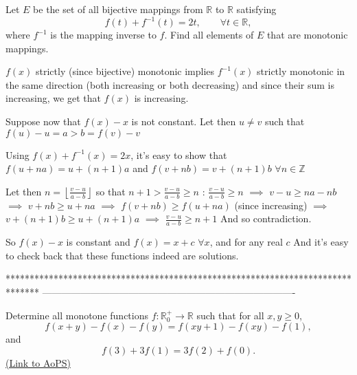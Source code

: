 \begin{solution}
	\begin{tcolorbox}Let $E$ be the set of all bijective mappings from $\mathbb R$ to $\mathbb R$ satisfying
\[f(t) + f^{-1}(t) = 2t, \qquad \forall t \in \mathbb R,\]
where $f^{-1}$ is the mapping inverse to $f$. Find all elements of $E$ that are monotonic mappings.\end{tcolorbox}
$f(x)$ strictly (since bijective) monotonic implies $f^{-1}(x)$ strictly monotonic in the same direction (both increasing or both decreasing) and since their sum is increasing, we get that $f(x)$ is increasing.

Suppose now that $f(x)-x$ is not constant. Let then $u\ne v$ such that $f(u)-u=a>b=f(v)-v$

Using $f(x)+f^{-1}(x)=2x$, it's easy to show that $f(u+na)=u+(n+1)a$ and $f(v+nb)=v+(n+1)b$ $\forall n\in\mathbb Z$

Let then $n=\left\lfloor\frac{v-u}{a-b}\right\rfloor$ so that $n+1>\frac{v-u}{a-b}\ge n$ :
$\frac{v-u}{a-b}\ge n$ $\implies$ $v-u\ge na-nb$ 
$\implies$ $v+nb\ge u+na$
$\implies$ $f(v+nb)\ge f(u+na)$ (since increasing) 
$\implies$ $v+(n+1)b\ge u+(n+1)a$ 
$\implies$ $\frac{v-u}{a-b}\ge n+1$
And so contradiction.

So $f(x)-x$ is constant and $\boxed{f(x)=x+c}$ $\forall x$, and for any real $c$ 
And it's easy to check back that these functions indeed are solutions.
\end{solution}
*******************************************************************************
-------------------------------------------------------------------------------

\begin{problem}
	Determine all monotone functions $f:\mathbb{R}_0^+ \rightarrow \mathbb{R}$ such that  for all $x,y \geq 0$,
\[ f(x+y)-f(x)-f(y)=f(xy+1)-f(xy)-f(1),\] and \[f(3)+3f(1)=3f(2)+f(0).\]
	\flushright \href{https://artofproblemsolving.com/community/c6h410339}{(Link to AoPS)}
\end{problem}



